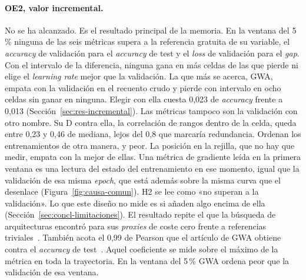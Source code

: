 \paragraph{OE2, valor incremental.} No se ha alcanzado. Es el resultado principal de la memoria. En la ventana del 5\,\% ninguna de las seis métricas supera a la referencia gratuita de su variable, el \emph{accuracy} de validación para el \emph{accuracy} de test y el \emph{loss} de validación para el \emph{gap}. Con el intervalo de la diferencia, ninguna gana en más celdas de las que pierde ni elige el \emph{learning rate} mejor que la validación. La que más se acerca, GWA, empata con la validación en el recuento crudo y pierde con intervalo en ocho celdas sin ganar en ninguna. Elegir con ella cuesta 0,023 de \emph{accuracy} frente a 0,013 (Sección~\ref{sec:res-incremental}). Las métricas tampoco son la validación con otro nombre. Su D contra ella, la correlación de rangos dentro de la celda, queda entre 0,23 y 0,46 de mediana, lejos del 0,8 que marcaría redundancia. Ordenan los entrenamientos de otra manera, y peor. La posición en la rejilla, que no hay que medir, empata con la mejor de ellas. Una métrica de gradiente leída en la primera ventana es una lectura del estado del entrenamiento en ese momento, igual que la validación de esa misma \emph{epoch}, que está además sobre la misma curva que el desenlace (Figura~\ref{fig:causa-comun}). H2 se lee como «no superan a la validación». Lo que este diseño no mide es si añaden algo encima de ella (Sección~\ref{sec:concl-limitaciones}). El resultado repite el que la búsqueda de arquitecturas encontró para sus \emph{proxies} de coste cero frente a referencias triviales~\cite{abdelfattah2021zerocost,white2022deeper}. También acota el 0,99 de Pearson que el artículo de GWA obtiene contra el \emph{accuracy} de test~\cite{hoelzl2025gradient}. Aquel coeficiente se mide sobre el máximo de la métrica en toda la trayectoria. En la ventana del 5\,\% GWA ordena peor que la validación de esa ventana.

